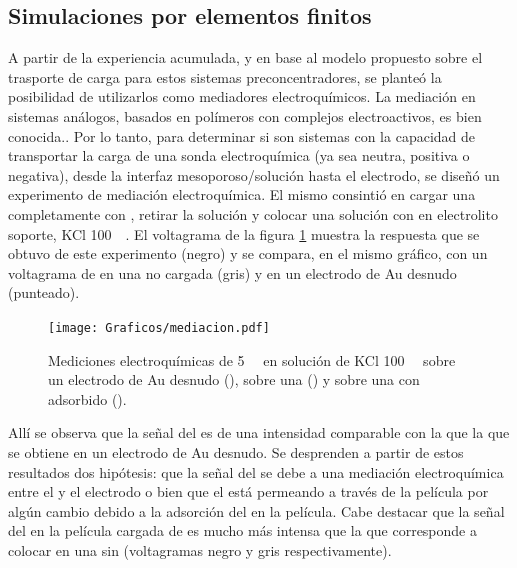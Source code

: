 	\subsection{Simulaciones por elementos finitos}	

		A partir de la experiencia acumulada, y en base al modelo propuesto sobre el trasporte de carga para estos sistemas preconcentradores, se planteó la posibilidad de utilizarlos como mediadores electroquímicos. 
    	La mediación en sistemas análogos, basados en polímeros con complejos electroactivos, es bien conocida.\cite{Kolb1993,ybarra2005}. Por lo tanto, para determinar si son sistemas con la capacidad de transportar la carga de una sonda electroquímica (ya sea neutra, positiva o negativa), desde la interfaz mesoporoso/solución hasta el electrodo, se diseñó un experimento de mediación electroquímica. El mismo consintió en cargar una \pdmF\space completamente con \ru, retirar la solución y colocar una solución con \fc\space en electrolito soporte, KCl \SI{100}{\milli\Molar}. El voltagrama de la figura \ref{fig:mediacion} muestra la respuesta que se obtuvo de este experimento (negro) y se compara, en el mismo gráfico, con un voltagrama de \fc\space en una \pdmF\space no cargada (gris) y en un electrodo de Au desnudo (punteado).  

        	\begin{figure}[h!]	
					\centering
			 	    \texttt{[image: Graficos/mediacion.pdf]}
			        \caption[Voltagrama de \ru\space y \fc.]{Mediciones electroquímicas de \fc\space \SI{5}{\milli\Molar} en solución de KCl \SI{100}{\milli\Molar} sobre un electrodo de Au desnudo (\usebox{\punteado}), sobre una \pdmF\space (\usebox{\gris}) y sobre una \pdmF\space con \ru\space adsorbido (\usebox{\negro}).}
			        \label{fig:mediacion}
			      	\end{figure}

		Allí se observa que la señal del \fc\space es de una intensidad comparable con la que la que se obtiene en un electrodo de Au desnudo. Se desprenden a partir de estos resultados dos hipótesis: que la señal del \fc\space se debe a una mediación electroquímica entre el \ru\space y el electrodo o bien que el \fc\space está permeando a través de la película por algún cambio debido a la adsorción del \ru\space en la película. Cabe destacar que la señal del \fc\space en la película cargada de \ru\space es mucho más intensa que la que corresponde a colocar \fc\space en una \pdmF\space sin \ru\space (voltagramas negro y gris respectivamente).

